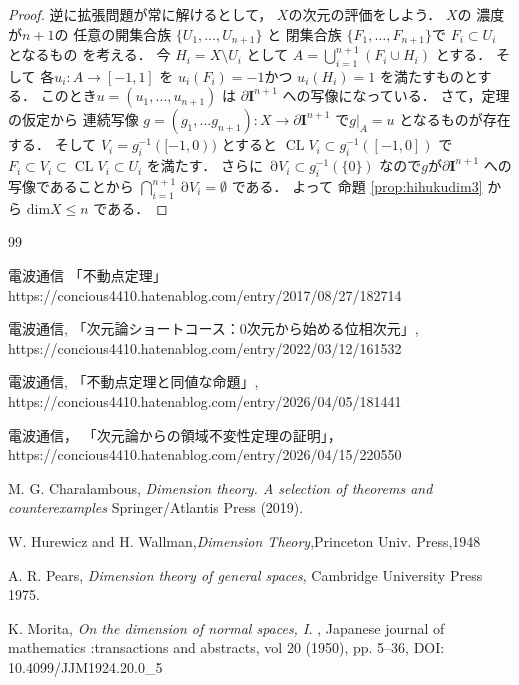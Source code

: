 \documentclass[leqno, a4paper, 12pt]{jsarticle}
\DeclareMathOperator{\bd}{\partial}
\DeclareMathOperator{\cl}{CL}
\newcommand{\yodim}{\mathrm{dim}}
\newcommand{\yocubebd}[1]{\partial\mathbf{I}^{#1}}
\numberwithin{equation}{section}
\begin{document}
\begin{proof}
逆に拡張問題が常に解けるとして，
$X$の次元の評価をしよう．
$X$の
濃度が$n+1$の
任意の開集合族
$\{U_{1}, \dots, U_{n+1}\}$
と
閉集合族
$\{F_{1}, \dots, F_{n+1}\}$で
$F_{i}\subset U_{i}$
となるもの
を考える．
今
$H_{i}=X\setminus U_{i}$
として
$A=\bigcup_{i=1}^{n+1}(F_{i}\cup H_{i})$
とする．
そして
各$u_{i}\colon A\to [-1, 1]$
を
$u_{i}(F_{i})=-1$かつ
$u_{i}(H_{i})=1$
を満たすものとする．
このとき$u=(u_{1}, \dots, u_{n+1})$
は
$\yocubebd{n+1}$
への写像になっている．
さて，定理の仮定から
連続写像
$g=(g_{1}, \dots g_{n+1})\colon X\to \yocubebd{n+1}$
で$g|_{A}=u$
となるものが存在する．
そして
$V_{i}=g_{i}^{-1}([-1, 0))$
とすると
$\cl V_{i}\subset g_{i}^{-1}([-1, 0])$
で
$F_{i}\subset V_{i}\subset \cl V_{i}\subset U_{i}$
を満たす．
さらに
$\bd V_{i}\subset g_{i}^{-1}(\{0\})$
なので$g$が$\yocubebd{n+1}$
への写像であることから
$\bigcap_{i=1}^{n+1}\bd V_{i}=\emptyset$
である．
よって
命題
\ref{prop:hihukudim3}
から
$\yodim X\le n$
である．
\end{proof}







\begin{thebibliography}{99}

電波通信
「不動点定理」
https://concious4410.hatenablog.com/entry/2017/08/27/182714




電波通信, 「次元論ショートコース：0次元から始める位相次元」, 
https://concious4410.hatenablog.com/entry/2022/03/12/161532


電波通信, 「不動点定理と同値な命題」, 
https://concious4410.hatenablog.com/entry/2026/04/05/181441

電波通信，
「次元論からの領域不変性定理の証明」，
https://concious4410.hatenablog.com/entry/2026/04/15/220550

M. G. Charalambous, 
\textit{Dimension theory. A selection of theorems and counterexamples} Springer/Atlantis Press (2019). 

W. Hurewicz and H. Wallman,\textit{Dimension Theory},Princeton Univ. Press,1948

 A. R. 
 Pears,
 \textit{Dimension theory of general spaces}, 
 {Cambridge} {University} {Press}
1975. 

K. Morita, 
\textit{On the dimension of normal spaces, I. }, 
Japanese journal of mathematics :transactions and abstracts, 
vol 20
(1950), 
pp. 5--36, 
DOI: 
10.4099/JJM1924.20.0\_5


\end{thebibliography}




			
\end{document}
